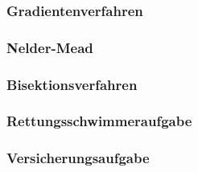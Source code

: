 \documentclass[10pt]{article}         %
\begin{document}
\subsubsection{Gradientenverfahren}


\subsubsection{Nelder-Mead}


\subsubsection{Bisektionsverfahren}


\subsubsection{Rettungsschwimmeraufgabe}


\subsubsection{Versicherungsaufgabe}

\end{document}
